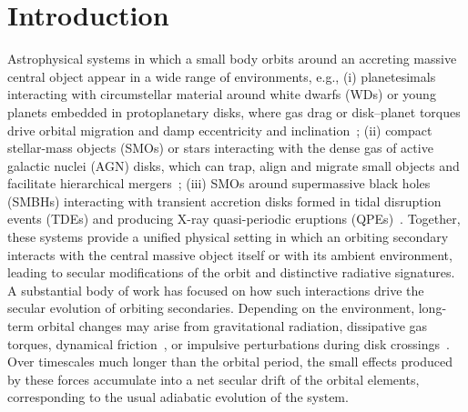 \documentclass[aps,prx,reprint,superscriptaddress,nofootinbib,longbibliography]{revtex4-1}
\begin{document}
\section{Introduction}
Astrophysical systems in which a small body orbits around an accreting massive central object appear in a wide range of environments, e.g.,  (i) planetesimals interacting with circumstellar material around  white dwarfs (WDs) or young planets embedded in protoplanetary disks, where gas drag or disk–planet torques drive orbital migration and damp eccentricity and inclination~\cite{OConnor2020,annurev:/content/journals/10.1146/annurev-astro-081811-125523,refId1}; (ii) compact stellar-mass objects (SMOs) or stars interacting with the dense gas of active galactic nuclei (AGN) disks, which can trap, align and migrate small objects and facilitate hierarchical mergers~\cite{Yang_2019,Peng_2025,10.1111/j.1745-3933.2011.01132.x,10.1111/j.1365-2966.2006.11155.x,10.1093/mnras/stw2260,Tagawa_2020}; (iii) SMOs around supermassive black holes (SMBHs) interacting with transient accretion disks formed in tidal disruption events (TDEs) and producing X-ray  quasi-periodic eruptions (QPEs)~\cite{Xian_2021,Linial_2023,refId2,10.1093/mnras/stad2616,PhysRevD.109.103031,PhysRevD.110.083019,Zhou_2025}.
Together, these systems provide a unified physical setting in which an orbiting secondary interacts with the central massive object itself or with its ambient environment, leading to secular modifications of the orbit and distinctive radiative signatures. A substantial body of work has focused on how such interactions drive the secular evolution of orbiting secondaries. Depending on the environment, long-term orbital changes may arise from gravitational radiation, dissipative gas torques, dynamical friction~\cite{refId0,spieksma2025gripdiskdraggingcompanion}, or impulsive perturbations during disk crossings~\cite{OConnor2020,Wang2024,spieksma2025gripdiskdraggingcompanion,Rowan_2025,10.1093/mnras/staa3004,10.1093/mnras/stad1295,Secunda_2021,MacLeod:2019jxd}. Over timescales much longer than the orbital period, the small effects produced by these forces accumulate into a net secular drift of the orbital elements, corresponding to the usual adiabatic evolution of the system.
\end{document}
